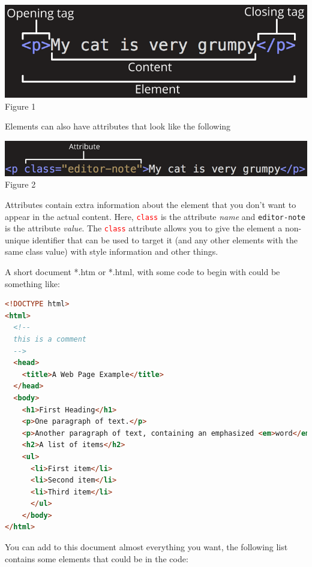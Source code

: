 \documentclass{article}
\begin{document}
    \begin{center}
    	\includegraphics[scale=0.4]{HTML_el.png}\\
    	\footnotesize Figure 1
    \end{center}
    
    \noindent Elements can also have attributes that look like the following
    
    \begin{center}
    	\includegraphics[scale=0.4]{HTML_el_att.png}\\
    	\footnotesize Figure 2
    \end{center}

    Attributes contain extra information about the element that you don't want to appear in the actual content. Here, \textcolor{red}{{\tt class}} is the attribute \textit{name} and {\tt editor-note} is the attribute \textit{value}. The \textcolor{red}{{\tt class}} attribute allows you to give the element a non-unique identifier that can be used to target it (and any other elements with the same class value) with style information and other things. \par
    
    A short document *.htm or *.html, with some code to begin with could be something like:
    
    \begin{lstlisting}[language=html]
<!DOCTYPE html>
<html>
  <!-- 
  this is a comment
  -->
  <head>
    <title>A Web Page Example</title>
  </head>
  <body>
    <h1>First Heading</h1>
    <p>One paragraph of text.</p>
    <p>Another paragraph of text, containing an emphasized <em>word</em>.</p>
    <h2>A list of items</h2>
    <ul>
      <li>First item</li>
      <li>Second item</li>
      <li>Third item</li>
      </ul>
    </body>
</html>
    \end{lstlisting}

    You can add to this document almost everything you want, the following list contains some elements that could be in the code:
\end{document}
